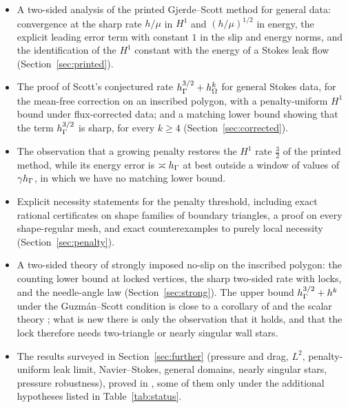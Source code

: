 \begin{itemize}
\item A two-sided analysis of the printed Gjerde--Scott method for general data: convergence at the sharp rate $h/\mu$ in $H^1$ and $(h/\mu)^{1/2}$ in energy, the explicit leading error term with constant $1$ in the slip and energy norms, and the identification of the $H^1$ constant with the energy of a Stokes leak flow (Section~\ref{sec:printed}).
\item The proof of Scott's conjectured rate $h_\Gamma^{3/2}+h_\Omega^k$ for general Stokes data, for the mean-free correction on an inscribed polygon, with a penalty-uniform $H^1$ bound under flux-corrected data; and a matching lower bound showing that the term $h_\Gamma^{3/2}$ is sharp, for every $k\ge4$ (Section~\ref{sec:corrected}).
\item The observation that a growing penalty restores the $H^1$ rate $\frac32$ of the printed method, while its energy error is $\asymp h_\Gamma$ at best outside a window of values of $\gamma h_\Gamma$, in which we have no matching lower bound.
\item Explicit necessity statements for the penalty threshold, including exact rational certificates on shape families of boundary triangles, a proof on every shape-regular mesh, and exact counterexamples to purely local necessity (Section~\ref{sec:penalty}).
\item A two-sided theory of strongly imposed no-slip on the inscribed polygon: the counting lower bound at locked vertices, the sharp two-sided rate with locks, and the needle-angle law (Section~\ref{sec:strong}). The upper bound $h_\Gamma^{3/2}+h^k$ under the Guzm\'an--Scott condition is close to a corollary of \cite{GuzmanScott2019} and the scalar theory \cite{BergerScottStrang1972,Scott1975}; what is new there is only the observation that it holds, and that the lock therefore needs two-triangle or nearly singular wall stars.
\item The results surveyed in Section~\ref{sec:further} (pressure and drag, $L^2$, penalty-uniform leak limit, Navier--Stokes, general domains, nearly singular stars, pressure robustness), proved in \cite{PadhiExt}, some of them only under the additional hypotheses listed in Table~\ref{tab:status}.
\end{itemize}
